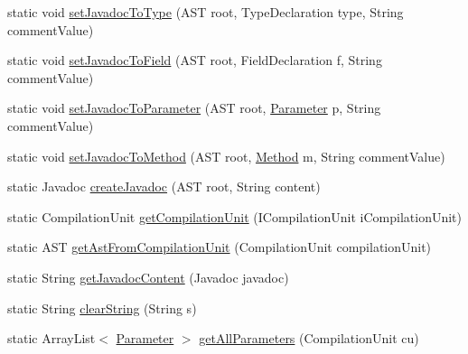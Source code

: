 \begin{DoxyCompactItemize}
\item 
static void \hyperlink{classit_1_1isislab_1_1masonhelperdocumentation_1_1analizer_1_1_global_utility_acd6fb2444864ade94dfbf8b4d2e35f2d}{set\-Javadoc\-To\-Type} (A\-S\-T root, Type\-Declaration type, String comment\-Value)
\item 
static void \hyperlink{classit_1_1isislab_1_1masonhelperdocumentation_1_1analizer_1_1_global_utility_ab5e6e9e83773a660f295d06be2f40518}{set\-Javadoc\-To\-Field} (A\-S\-T root, Field\-Declaration f, String comment\-Value)
\item 
static void \hyperlink{classit_1_1isislab_1_1masonhelperdocumentation_1_1analizer_1_1_global_utility_af418671fe91440165220bf0c0aad50c4}{set\-Javadoc\-To\-Parameter} (A\-S\-T root, \hyperlink{classit_1_1isislab_1_1masonhelperdocumentation_1_1analizer_1_1_parameter}{Parameter} p, String comment\-Value)
\item 
static void \hyperlink{classit_1_1isislab_1_1masonhelperdocumentation_1_1analizer_1_1_global_utility_a8d7769b09902880eab5ba813ea5207f2}{set\-Javadoc\-To\-Method} (A\-S\-T root, \hyperlink{classit_1_1isislab_1_1masonhelperdocumentation_1_1analizer_1_1_method}{Method} m, String comment\-Value)
\item 
static Javadoc \hyperlink{classit_1_1isislab_1_1masonhelperdocumentation_1_1analizer_1_1_global_utility_a55f18ef6750c7a3af62e1278e3f68ae9}{create\-Javadoc} (A\-S\-T root, String content)
\item 
static Compilation\-Unit \hyperlink{classit_1_1isislab_1_1masonhelperdocumentation_1_1analizer_1_1_global_utility_ab67eeb8fd92b522140428a0f932d22de}{get\-Compilation\-Unit} (I\-Compilation\-Unit i\-Compilation\-Unit)
\item 
static A\-S\-T \hyperlink{classit_1_1isislab_1_1masonhelperdocumentation_1_1analizer_1_1_global_utility_a71e7c097645ee14b6757fdf7f7c9fc99}{get\-Ast\-From\-Compilation\-Unit} (Compilation\-Unit compilation\-Unit)
\item 
static String \hyperlink{classit_1_1isislab_1_1masonhelperdocumentation_1_1analizer_1_1_global_utility_aa1a3f2c1fcc61a1a3c1f9d084308b543}{get\-Javadoc\-Content} (Javadoc javadoc)
\item 
static String \hyperlink{classit_1_1isislab_1_1masonhelperdocumentation_1_1analizer_1_1_global_utility_aa713a96b1680738784bd341d3ffd1e00}{clear\-String} (String s)
\item 
static Array\-List$<$ \hyperlink{classit_1_1isislab_1_1masonhelperdocumentation_1_1analizer_1_1_parameter}{Parameter} $>$ \hyperlink{classit_1_1isislab_1_1masonhelperdocumentation_1_1analizer_1_1_global_utility_a7bfa58de5b5e760b043e34e98aa222ee}{get\-All\-Parameters} (Compilation\-Unit cu)

\end{DoxyCompactItemize}
